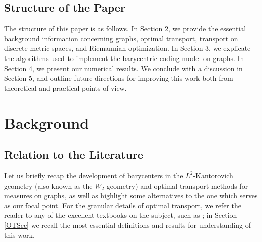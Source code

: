 \documentclass{article}
\begin{document}
\subsection{Structure of the Paper}
The structure of this paper is as follows. In Section 2, we provide the essential background information concerning graphs, optimal transport, transport on discrete metric spaces, and Riemannian optimization. In Section 3, we explicate the algorithms used to implement the barycentric coding model on graphs. In Section 4, we present our numerical results. We conclude with a discussion in Section 5, and outline future directions for improving this work both from theoretical and practical points of view.

\section{Background}
\subsection{Relation to the Literature}

Let us briefly recap the development of barycenters in the \(L^2\)-Kantorovich geometry (also known as the \(W_2\) geometry) and optimal transport methods for measures on graphs, as well as highlight some alternatives to the one which serves as our focal point. For the granular details of optimal transport, we refer the reader to any of the excellent textbooks on the subject, such as \cite{ambrosio2021lectures, figalli2021invitation, villaniOptimalTransport2009, santambrogioOptimalTransportApplied2015}; in Section \ref{OTSec} we recall the most essential definitions and results for understanding of this work.
\end{document}
